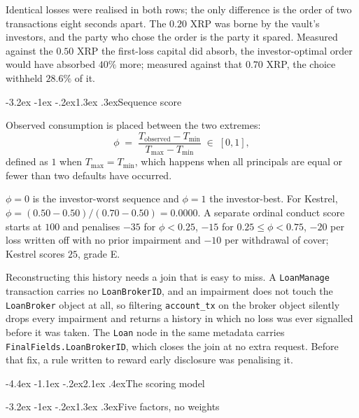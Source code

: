 \documentclass[11pt]{article}
\makeatletter
\renewcommand\section{\@startsection{section}{1}{\z@}%
  {-4.4ex \@plus -1.1ex \@minus -.2ex}{2.1ex \@plus .4ex}{\normalfont\Large\bfseries}}
\renewcommand\subsection{\@startsection{subsection}{2}{\z@}%
  {-3.2ex \@plus -1ex \@minus -.2ex}{1.3ex \@plus .3ex}{\normalfont\large\bfseries}}
\theoremstyle{orma}
\theoremstyle{ormaupright}
\makeatother
\begin{document}
Identical losses were realised in both rows; the only difference is the order of two
transactions eight seconds apart. The $0.20$ XRP was borne by the vault's investors, and
the party who chose the order is the party it spared. Measured against the $0.50$ XRP the
first-loss capital did absorb, the investor-optimal order would have absorbed $40\%$ more;
measured against that $0.70$ XRP, the choice withheld $28.6\%$ of it.

\subsection{Sequence score}

Observed consumption is placed between the two extremes:
\begin{equation}
  \phi \;=\; \frac{T_{\mathrm{observed}} - T_{\min}}{T_{\max} - T_{\min}} \;\in\; [0, 1],
\end{equation}
defined as $1$ when $T_{\max} = T_{\min}$, which happens when all principals are equal or
fewer than two defaults have occurred.

$\phi = 0$ is the investor-worst sequence and
$\phi = 1$ the investor-best. For Kestrel,
$\phi = (0.50 - 0.50)/(0.70 - 0.50) = 0.0000$. A separate ordinal conduct score starts at
$100$ and penalises $-35$ for $\phi < 0.25$, $-15$ for $0.25 \leq \phi < 0.75$, $-20$ per
loss written off with no prior impairment and $-10$ per withdrawal of cover; Kestrel scores
$25$, grade E.

Reconstructing this history needs a join that is easy to miss. A \texttt{LoanManage}
transaction carries no \texttt{LoanBrokerID}, and an impairment does not touch the
\texttt{LoanBroker} object at all, so filtering \texttt{account\_tx} on the broker object
silently drops every impairment and returns a history in which no loss was ever signalled
before it was taken. The \texttt{Loan} node in the same metadata carries
\texttt{FinalFields.LoanBrokerID}, which closes the join at no extra request. Before that
fix, a rule written to reward early disclosure was penalising it.

\section{The scoring model}

\subsection{Five factors, no weights}
\end{document}
